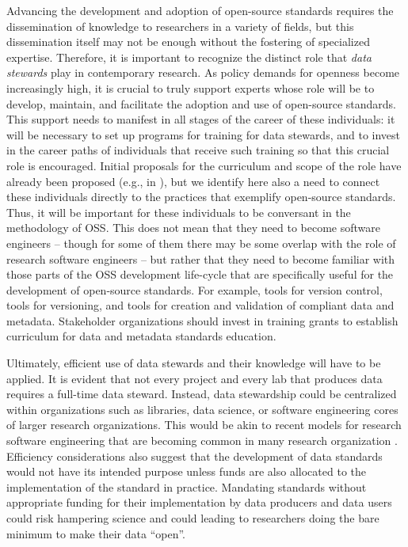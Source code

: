 \documentclass[
  number]{elsarticle}
\begin{document}
Advancing the development and adoption of open-source standards requires
the dissemination of knowledge to researchers in a variety of fields,
but this dissemination itself may not be enough without the fostering of
specialized expertise. Therefore, it is important to recognize the
distinct role that \emph{data stewards} play in contemporary research.
As policy demands for openness become increasingly high, it is crucial
to truly support experts whose role will be to develop, maintain, and
facilitate the adoption and use of open-source standards. This support
needs to manifest in all stages of the career of these individuals: it
will be necessary to set up programs for training for data stewards, and
to invest in the career paths of individuals that receive such training
so that this crucial role is encouraged. Initial proposals for the
curriculum and scope of the role have already been proposed (e.g., in
\citep{Mons2018DataStewardshipBook}), but we identify here also a need
to connect these individuals directly to the practices that exemplify
open-source standards. Thus, it will be important for these individuals
to be conversant in the methodology of OSS. This does not mean that they
need to become software engineers -- though for some of them there may
be some overlap with the role of research software engineers
\citep{Connolly2023Software} -- but rather that they need to become
familiar with those parts of the OSS development life-cycle that are
specifically useful for the development of open-source standards. For
example, tools for version control, tools for versioning, and tools for
creation and validation of compliant data and metadata. Stakeholder
organizations should invest in training grants to establish curriculum
for data and metadata standards education.

Ultimately, efficient use of data stewards and their knowledge will have
to be applied. It is evident that not every project and every lab that
produces data requires a full-time data steward. Instead, data
stewardship could be centralized within organizations such as libraries,
data science, or software engineering cores of larger research
organizations. This would be akin to recent models for research software
engineering that are becoming common in many research organization
\citep{Van-Tuyl2023-vp}. Efficiency considerations also suggest that the
development of data standards would not have its intended purpose unless
funds are also allocated to the implementation of the standard in
practice. Mandating standards without appropriate funding for their
implementation by data producers and data users could risk hampering
science and could leading to researchers doing the bare minimum to make
their data ``open''.
\end{document}
